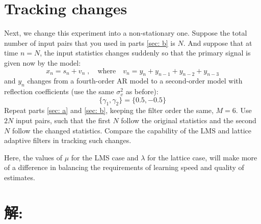 \documentclass[11pt]{article}
\begin{document}
\section{Tracking changes}
Next, we change this experiment into a non-stationary one. Suppose the total number of input pairs that you used in parts \eqref{sec: b} is $N$. And suppose that at time $n = N$, the input statistics changes suddenly so that the primary signal is given now by the model:
$$x_n = s_n + v_n\;, \hspace{1em}\text{where}\hspace{1em} v_{n}=y_{n}+y_{n-1}+y_{n-2}+y_{n-3}$$
and $y_n$ changes from a fourth-order AR model to a second-order model with reflection coefficients (use the same $σ^2_v$ as before):
$$\{γ_1, γ_2\} = \{0.5,−0.5\}$$
Repeat parts \eqref{sec: a} and \eqref{sec: b}, keeping the filter order the same, $M = 6$. Use $2N$ input pairs, such that the first $N$ follow the original statistics and the second $N$ follow the changed statistics. Compare the capability of the LMS and lattice adaptive filters in tracking such changes.

Here, the values of $μ$ for the LMS case and $λ$ for the lattice case, will make more of a difference in balancing the requirements of learning speed and quality of estimates.
\section*{解:}\label{solution: c}
\end{document}

